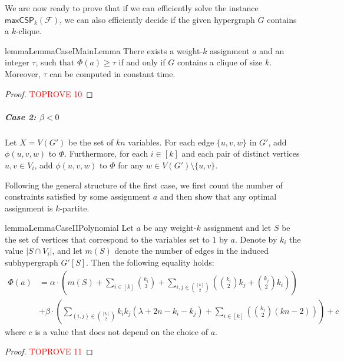 \documentclass[a4paper,UKenglish,cleveref, autoref, thm-restate,numberwithinsect]{lipics-v2021}
\newcommand{\maxcspk}{\textsf{maxCSP}_{k}}
\newcommand{\Fam}{\mathcal{F}}
\begin{document}
We are now ready to prove that if we can efficiently solve the instance $\maxcspk(\Fam)$, we can also efficiently decide if the given hypergraph $G$ contains a $k$-clique.
\begin{restatable}{lemma}{LemmaCaseIMainLemma}\label{lemma:case-1-main-lemma}
    There exists a weight-$k$ assignment $a$ and an integer $\tau$, such that $\Phi(a)\geq \tau$ if and only if $G$ contains a clique of size $k$. Moreover, $\tau$ can be computed in constant time.
\end{restatable}
\begin{proof}\textcolor{red}{TOPROVE 10}\end{proof}
\subparagraph*{{Case 2: $\beta<0$}}
\begin{construction}\label{construction:b<0}
    Let $X = V(G')$ be the set of $kn$ variables.
    For each edge $\{u,v,w\}$ in $G'$, add $\phi(u,v,w)$ to $\Phi$.
    Furthermore, for each $i\in [k]$ and each pair of distinct vertices $u,v\in V_i$, add $\phi(u,v,w)$ to $\Phi$ for any $w\in V(G')\setminus\{u,v\}$.
\end{construction}
Following the general structure of the first case, we first count the number of constraints satisfied by some assignment $a$ and then show that any optimal assignment is $k$-partite.
\begin{restatable}{lemma}{LemmaCaseIIPolynomial}\label{lemma:case2-any-assignment}
    Let $a$ be any weight-$k$ assignment and let $S$ be the set of vertices that correspond to the variables set to $1$ by $a$.
    Denote by $k_i$ the value $|S\cap V_i|$, and let $m(S)$ denote the number of edges in the induced subhypergraph $G'[S]$.
    Then the following equality holds:
    \begin{align*}
    \Phi(a) &= \alpha\cdot \left(m(S) + \sum_{i\in [k]}\binom{k_i}{3} + \sum_{i,j\in\binom{[k]}{2}}\left(\binom{k_i}{2}k_j + \binom{k_j}{2}k_i\right)\right) 
    \\ &+ \beta \cdot\left(\sum_{(i,j)\in \binom{[k]}{2}} k_ik_j (\lambda + 2n-k_i-k_j) + \sum_{i\in [k]} \left(\binom{k_i}{2}(kn-2)\right)\right)  + c
\end{align*}
    where $c$ is a value that does not depend on the choice of $a$.
\end{restatable}
\begin{proof}\textcolor{red}{TOPROVE 11}\end{proof}
\end{document}
